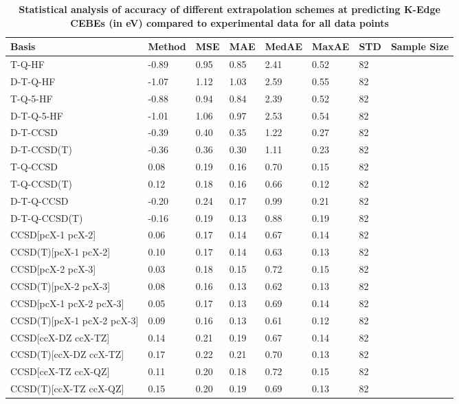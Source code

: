 \begin{table}
  \caption{\textbf{Statistical analysis of accuracy of different extrapolation schemes at predicting K-Edge CEBEs (in eV) compared to experimental data for all data points}}
  \label{tbl:extrap-all-summary}
  \begin{tabular}{l l l l l l l l }
    \toprule
    \textbf{Basis} & \textbf{Method} & \textbf{MSE} & \textbf{MAE} & \textbf{MedAE} & \textbf{MaxAE} & \textbf{STD} & \textbf{Sample Size} \\ 
    \midrule
    T-Q-HF & -0.89 & 0.95 & 0.85 & 2.41 & 0.52 & 82 \\ 
    D-T-Q-HF & -1.07 & 1.12 & 1.03 & 2.59 & 0.55 & 82 \\ 
    T-Q-5-HF & -0.88 & 0.94 & 0.84 & 2.39 & 0.52 & 82 \\ 
    D-T-Q-5-HF & -1.01 & 1.06 & 0.97 & 2.53 & 0.54 & 82 \\ 
    D-T-CCSD & -0.39 & 0.40 & 0.35 & 1.22 & 0.27 & 82 \\ 
    D-T-CCSD(T) & -0.36 & 0.36 & 0.30 & 1.11 & 0.23 & 82 \\ 
    T-Q-CCSD & 0.08 & 0.19 & 0.16 & 0.70 & 0.15 & 82 \\ 
    T-Q-CCSD(T) & 0.12 & 0.18 & 0.16 & 0.66 & 0.12 & 82 \\ 
    D-T-Q-CCSD & -0.20 & 0.24 & 0.17 & 0.99 & 0.21 & 82 \\ 
    D-T-Q-CCSD(T) & -0.16 & 0.19 & 0.13 & 0.88 & 0.19 & 82 \\ 
    CCSD[pcX-1 pcX-2] & 0.06 & 0.17 & 0.14 & 0.67 & 0.14 & 82 \\ 
    CCSD(T)[pcX-1 pcX-2] & 0.10 & 0.17 & 0.14 & 0.63 & 0.13 & 82 \\ 
    CCSD[pcX-2 pcX-3] & 0.03 & 0.18 & 0.15 & 0.72 & 0.15 & 82 \\ 
    CCSD(T)[pcX-2 pcX-3] & 0.08 & 0.16 & 0.13 & 0.62 & 0.13 & 82 \\ 
    CCSD[pcX-1 pcX-2 pcX-3] & 0.05 & 0.17 & 0.13 & 0.69 & 0.14 & 82 \\ 
    CCSD(T)[pcX-1 pcX-2 pcX-3] & 0.09 & 0.16 & 0.13 & 0.61 & 0.12 & 82 \\ 
    CCSD[ccX-DZ ccX-TZ] & 0.14 & 0.21 & 0.19 & 0.67 & 0.14 & 82 \\ 
    CCSD(T)[ccX-DZ ccX-TZ] & 0.17 & 0.22 & 0.21 & 0.70 & 0.13 & 82 \\ 
    CCSD[ccX-TZ ccX-QZ] & 0.11 & 0.20 & 0.18 & 0.72 & 0.15 & 82 \\ 
    CCSD(T)[ccX-TZ ccX-QZ] & 0.15 & 0.20 & 0.19 & 0.69 & 0.13 & 82 \\ 

\end{tabular}
\end{table}
